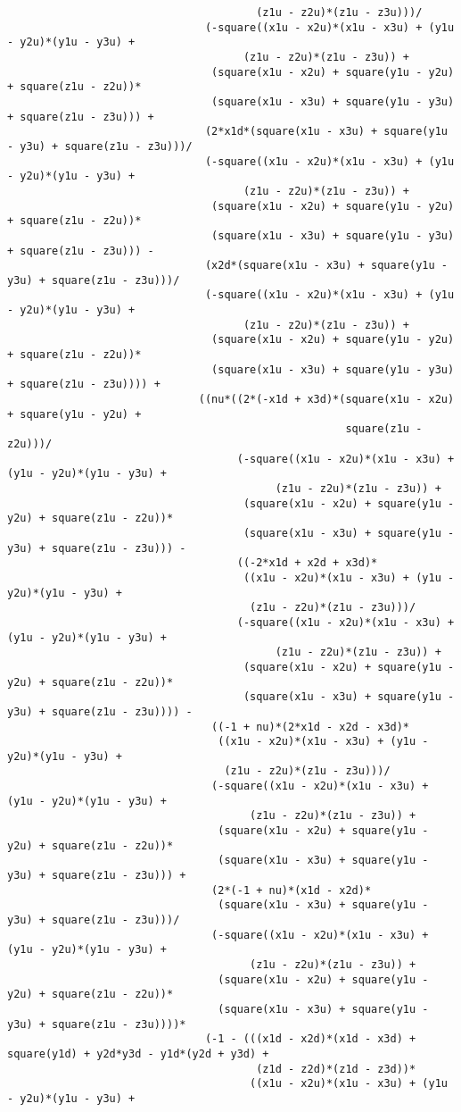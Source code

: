 \begin{lstlisting}
									   (z1u - z2u)*(z1u - z3u)))/
							   (-square((x1u - x2u)*(x1u - x3u) + (y1u - y2u)*(y1u - y3u) + 
									 (z1u - z2u)*(z1u - z3u)) + 
								(square(x1u - x2u) + square(y1u - y2u) + square(z1u - z2u))*
								(square(x1u - x3u) + square(y1u - y3u) + square(z1u - z3u))) + 
							   (2*x1d*(square(x1u - x3u) + square(y1u - y3u) + square(z1u - z3u)))/
							   (-square((x1u - x2u)*(x1u - x3u) + (y1u - y2u)*(y1u - y3u) + 
									 (z1u - z2u)*(z1u - z3u)) + 
								(square(x1u - x2u) + square(y1u - y2u) + square(z1u - z2u))*
								(square(x1u - x3u) + square(y1u - y3u) + square(z1u - z3u))) - 
							   (x2d*(square(x1u - x3u) + square(y1u - y3u) + square(z1u - z3u)))/
							   (-square((x1u - x2u)*(x1u - x3u) + (y1u - y2u)*(y1u - y3u) + 
									 (z1u - z2u)*(z1u - z3u)) + 
								(square(x1u - x2u) + square(y1u - y2u) + square(z1u - z2u))*
								(square(x1u - x3u) + square(y1u - y3u) + square(z1u - z3u)))) + 
							  ((nu*((2*(-x1d + x3d)*(square(x1u - x2u) + square(y1u - y2u) + 
													 square(z1u - z2u)))/
									(-square((x1u - x2u)*(x1u - x3u) + (y1u - y2u)*(y1u - y3u) + 
										  (z1u - z2u)*(z1u - z3u)) + 
									 (square(x1u - x2u) + square(y1u - y2u) + square(z1u - z2u))*
									 (square(x1u - x3u) + square(y1u - y3u) + square(z1u - z3u))) - 
									((-2*x1d + x2d + x3d)*
									 ((x1u - x2u)*(x1u - x3u) + (y1u - y2u)*(y1u - y3u) + 
									  (z1u - z2u)*(z1u - z3u)))/
									(-square((x1u - x2u)*(x1u - x3u) + (y1u - y2u)*(y1u - y3u) + 
										  (z1u - z2u)*(z1u - z3u)) + 
									 (square(x1u - x2u) + square(y1u - y2u) + square(z1u - z2u))*
									 (square(x1u - x3u) + square(y1u - y3u) + square(z1u - z3u)))) - 
								((-1 + nu)*(2*x1d - x2d - x3d)*
								 ((x1u - x2u)*(x1u - x3u) + (y1u - y2u)*(y1u - y3u) + 
								  (z1u - z2u)*(z1u - z3u)))/
								(-square((x1u - x2u)*(x1u - x3u) + (y1u - y2u)*(y1u - y3u) + 
									  (z1u - z2u)*(z1u - z3u)) + 
								 (square(x1u - x2u) + square(y1u - y2u) + square(z1u - z2u))*
								 (square(x1u - x3u) + square(y1u - y3u) + square(z1u - z3u))) + 
								(2*(-1 + nu)*(x1d - x2d)*
								 (square(x1u - x3u) + square(y1u - y3u) + square(z1u - z3u)))/
								(-square((x1u - x2u)*(x1u - x3u) + (y1u - y2u)*(y1u - y3u) + 
									  (z1u - z2u)*(z1u - z3u)) + 
								 (square(x1u - x2u) + square(y1u - y2u) + square(z1u - z2u))*
								 (square(x1u - x3u) + square(y1u - y3u) + square(z1u - z3u))))*
							   (-1 - (((x1d - x2d)*(x1d - x3d) + square(y1d) + y2d*y3d - y1d*(y2d + y3d) + 
									   (z1d - z2d)*(z1d - z3d))*
									  ((x1u - x2u)*(x1u - x3u) + (y1u - y2u)*(y1u - y3u) + 

\end{lstlisting}
